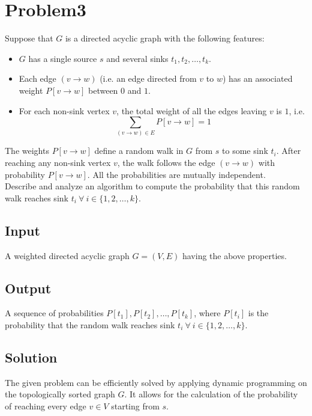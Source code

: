 \documentclass[12pt]{report}
\begin{document}
    \section*{\huge{Problem3}}
    Suppose that $G$ is a directed acyclic graph with the following features:
    \begin{itemize}
        \item $G$ has a single source $s$ and several sinks $t_{1}, t_{2}, \dots, t_{k}$.
        \item Each edge $(v \to w)$ (i.e. an edge directed from $v$ to $w$) has an associated weight $P[v \to w]$ between $0$ and $1$.
        \item For each non-sink vertex $v$, the total weight of all the edges leaving $v$ is $1$, i.e.
        \begin{equation}
            \label{eq:total_weight}
            \sum_{(v \to w) \in E} P[v \to w] = 1
        \end{equation}
    \end{itemize}
    The weights $P[v \to w]$ define a random walk in $G$ from $s$ to some sink $t_{i}$.
    After reaching any non-sink vertex $v$, the walk follows the edge $(v \to w)$ with probability $P[v \to w]$.
    All the probabilities are mutually independent. \\
    Describe and analyze an algorithm to compute the probability that this random walk reaches sink
    $t_{i} \ \forall \ i \in \{ 1, 2, \dots, k \}$.

    \subsection*{Input}
    A weighted directed acyclic graph $G = (V, E)$ having the above properties.

    \subsection*{Output}
    A sequence of probabilities $P[t_{1}], P[t_{2}], \dots, P[t_{k}]$, where $P[t_{i}]$ is the probability that the random walk
    reaches sink $t_{i} \ \forall \ i \in \{ 1, 2, \dots, k \}$.

    \subsection*{Solution}
    The given problem can be efficiently solved by applying dynamic programming on the topologically sorted graph $G$.
    It allows for the calculation of the probability of reaching every edge $v \in V$ starting from $s$.
\end{document}
